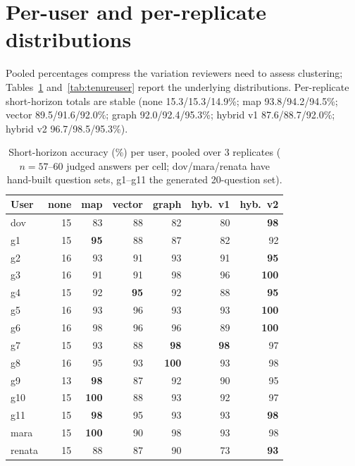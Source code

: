 \appendix

\section{Per-user and per-replicate distributions}
\label{app:distributions}

Pooled percentages compress the variation reviewers need to assess
clustering; Tables~\ref{tab:peruser} and~\ref{tab:tenureuser} report the
underlying distributions. Per-replicate short-horizon totals are stable (none
15.3/15.3/14.9\%; map 93.8/94.2/94.5\%; vector 89.5/91.6/92.0\%; graph
92.0/92.4/95.3\%; hybrid v1 87.6/88.7/92.0\%; hybrid v2
96.7/98.5/95.3\%).

\begin{table}[h]
\centering
\small
\caption{Short-horizon accuracy (\%) per user, pooled over 3 replicates
($n{=}57$--60 judged answers per cell; dov/mara/renata have hand-built
question sets, g1--g11 the generated 20-question set).}
\label{tab:peruser}
\begin{tabular}{lrrrrrr}
\toprule
User & none & map & vector & graph & hyb.\ v1 & hyb.\ v2 \\
\midrule
dov    & 15 & 83  & 88 & 82  & 80 & \textbf{98} \\
g1     & 15 & \textbf{95} & 88 & 87  & 82 & 92 \\
g2     & 16 & 93  & 91 & 93  & 91 & \textbf{95} \\
g3     & 16 & 91  & 91 & 98  & 96 & \textbf{100} \\
g4     & 15 & 92  & \textbf{95} & 92  & 88 & \textbf{95} \\
g5     & 16 & 93  & 96 & 93  & 93 & \textbf{100} \\
g6     & 16 & 98  & 96 & 96  & 89 & \textbf{100} \\
g7     & 15 & 93  & 88 & \textbf{98} & \textbf{98} & 97 \\
g8     & 16 & 95  & 93 & \textbf{100} & 93 & 98 \\
g9     & 13 & \textbf{98} & 87 & 92  & 90 & 95 \\
g10    & 15 & \textbf{100} & 88 & 93  & 92 & 97 \\
g11    & 15 & \textbf{98} & 95 & 93  & 93 & \textbf{98} \\
mara   & 15 & \textbf{100} & 90 & 98  & 93 & 98 \\
renata & 15 & 88  & 87 & 90  & 73 & \textbf{93} \\
\bottomrule
\end{tabular}
\end{table}

